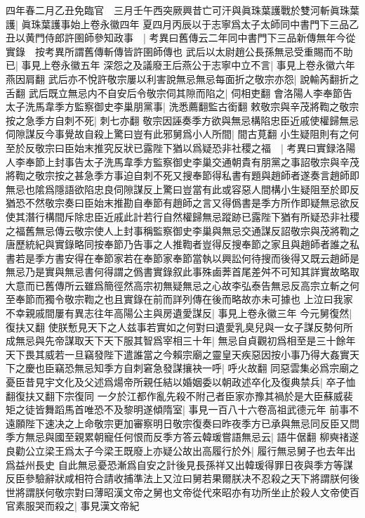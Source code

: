 四年春二月乙丑免臨官　三月壬午西突厥興昔亡可汗與眞珠葉護戰於雙河斬眞珠葉護|{
	眞珠葉護事始上卷永徽四年}
夏四月丙辰以于志寧爲太子太師同中書門下三品乙丑以黄門侍郎許圉師參知政事　|{
	考異曰舊傳云二年同中書門下三品新傳無年今從實錄　按考異所謂舊傳斬傳皆許圉師傳也}
武后以太尉趙公長孫無忌受重賜而不助已|{
	事見上卷永徽五年}
深怨之及議廢王后燕公于志寧中立不言|{
	事見上卷永徽六年燕因肩翻}
武后亦不悅許敬宗屢以利害說無忌無忌每面折之敬宗亦怨|{
	說輸芮翻折之舌翻}
武后既立無忌内不自安后令敬宗伺其隙而陷之|{
	伺相吏翻}
會洛陽人李奉節告太子洗馬韋季方監察御史李巢朋黨事|{
	洗悉薦翻監古銜翻}
敕敬宗與辛茂將鞫之敬宗按之急季方自刺不死|{
	刺七亦翻}
敬宗因誣奏季方欲與無忌構陷忠臣近戚使權歸無忌伺隙謀反今事覺故自殺上驚曰豈有此邪舅爲小人所間|{
	間古莧翻}
小生疑阻則有之何至於反敬宗曰臣始末推究反狀已露陛下猶以爲疑恐非社稷之福　|{
	考異曰實録洛陽人李奉節上封事告太子洗馬韋季方監察御史李巢交通朝貴有朋黨之事詔敬宗與辛茂將鞫之敬宗按之甚急季方事迫自刺不死又搜奉節得私書有題與趙師者遂奏言趙師即無忌也隂爲隱語欲陷忠良伺隙謀反上驚曰豈當有此或容惡人間構小生疑阻至於即反猶恐不然敬宗奏曰臣始末推勘自奉節有趙師之言又得僞書是季方所作即疑無忌欲反使其潛行構間斥除忠臣近戚此計若行自然權歸無忌蹤跡已露陛下猶有所疑恐非社稷之福舊無忌傳云敬宗使人上封事稱監察御史李巢與無忌交通謀反詔敬宗與茂將鞫之唐歷統紀與實錄略同按奉節乃告事之人推鞫者豈得反搜奉節之家且與趙師者誰之私書若是季方書安得在奉節家若在奉節家奉節當執以興訟何待搜而後得又既云趙師是無忌乃是實與無忌書何得謂之僞書實錄叙此事殊鹵莾首尾差舛不可知其詳實故略取大意而已舊傳所云雖爲簡徑然高宗初無疑無忌之心故李弘泰告無忌反高宗立斬之何至奉節而獨令敬宗鞫之也且實錄在前而詳列傳在後而略故亦未可據也}
上泣曰我家不幸親戚間屢有異志往年高陽公主與房遺愛謀反|{
	事見上卷永徽三年}
今元舅復然|{
	復扶又翻}
使朕慙見天下之人兹事若實如之何對曰遺愛乳臭兒與一女子謀反勢何所成無忌與先帝謀取天下天下服其智爲宰相三十年|{
	無忌自貞觀初爲相至是三十餘年}
天下畏其威若一旦竊發陛下遣誰當之今賴宗廟之靈皇天疾惡因按小事乃得大姦實天下之慶也臣竊恐無忌知季方自刺窘急發謀攘袂一呼|{
	呼火故翻}
同惡雲集必爲宗廟之憂臣昔見宇文化及父述爲煬帝所親任結以婚姻委以朝政述卒化及復典禁兵|{
	卒子恤翻復扶又翻下宗復同}
一夕於江都作亂先殺不附己者臣家亦豫其禍於是大臣蘇威裴矩之徒皆舞蹈馬首唯恐不及黎明遂傾隋室|{
	事見一百八十六卷高祖武德元年}
前事不遠願陛下速决之上命敬宗更加審察明日敬宗復奏曰昨夜季方已承與無忌同反臣又問季方無忌與國至親累朝寵任何恨而反季方答云韓瑗嘗語無忌云|{
	語牛倨翻}
柳奭禇遂良勸公立梁王爲太子今梁王既廢上亦疑公故出高履行於外|{
	履行無忌舅子也去年出爲益州長史}
自此無忌憂恐漸爲自安之計後見長孫祥又出韓瑗得罪日夜與季方等謀反臣參驗辭狀咸相符合請收捕準法上又泣曰舅若果爾朕决不忍殺之天下將謂朕何後世將謂朕何敬宗對曰薄昭漢文帝之舅也文帝從代來昭亦有功所坐止於殺人文帝使百官素服哭而殺之|{
	事見漢文帝紀}
